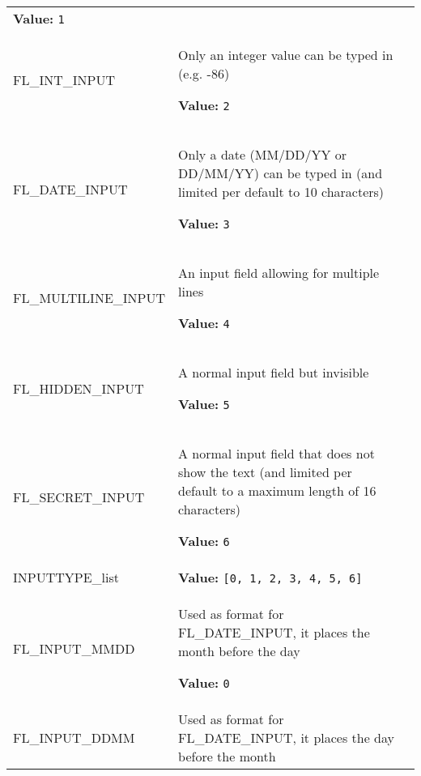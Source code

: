 \begin{longtable}{|p{\varnamewidth}|p{\vardescrwidth}|l}
\textbf{Value:} 
{\tt 1}&\\
\cline{1-2}
\raggedright F\-L\-\_\-I\-N\-T\-\_\-I\-N\-P\-U\-T\- & \raggedright Only an integer value can be typed in (e.g. -86)

\textbf{Value:} 
{\tt 2}&\\
\cline{1-2}
\raggedright F\-L\-\_\-D\-A\-T\-E\-\_\-I\-N\-P\-U\-T\- & \raggedright Only a date (MM/DD/YY or DD/MM/YY) can be typed in (and limited
per default to 10 characters)

\textbf{Value:} 
{\tt 3}&\\
\cline{1-2}
\raggedright F\-L\-\_\-M\-U\-L\-T\-I\-L\-I\-N\-E\-\_\-I\-N\-P\-U\-T\- & \raggedright An input field allowing for multiple lines

\textbf{Value:} 
{\tt 4}&\\
\cline{1-2}
\raggedright F\-L\-\_\-H\-I\-D\-D\-E\-N\-\_\-I\-N\-P\-U\-T\- & \raggedright A normal input field but invisible

\textbf{Value:} 
{\tt 5}&\\
\cline{1-2}
\raggedright F\-L\-\_\-S\-E\-C\-R\-E\-T\-\_\-I\-N\-P\-U\-T\- & \raggedright A normal input field that does not show the text (and limited
per default to a maximum length of 16 characters)

\textbf{Value:} 
{\tt 6}&\\
\cline{1-2}
\raggedright I\-N\-P\-U\-T\-T\-Y\-P\-E\-\_\-l\-i\-s\-t\- & \raggedright \textbf{Value:} 
{\tt \texttt{[}0\texttt{, }1\texttt{, }2\texttt{, }3\texttt{, }4\texttt{, }5\texttt{, }6\texttt{]}}&\\
\cline{1-2}
\raggedright F\-L\-\_\-I\-N\-P\-U\-T\-\_\-M\-M\-D\-D\- & \raggedright Used as format for FL\_DATE\_INPUT, it places the month before the day

\textbf{Value:} 
{\tt 0}&\\
\cline{1-2}
\raggedright F\-L\-\_\-I\-N\-P\-U\-T\-\_\-D\-D\-M\-M\- & \raggedright Used as format for FL\_DATE\_INPUT, it places the day before the month


\end{longtable}
